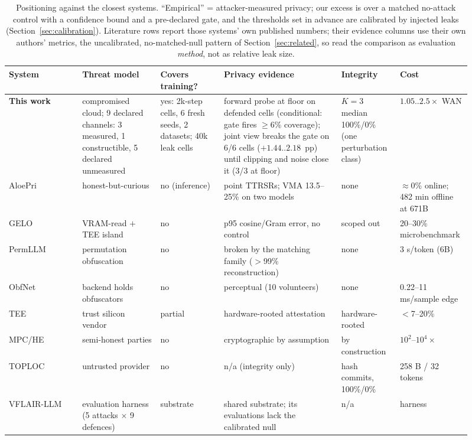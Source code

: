 \documentclass[11pt]{article}
\newcommand{\pp}{pp}
\begin{document}
\begin{table}[H]
\centering\scriptsize


\setlength{\tabcolsep}{3pt}
\begin{tabular}{@{}p{0.15\linewidth}p{0.16\linewidth}p{0.13\linewidth}p{0.24\linewidth}p{0.12\linewidth}p{0.11\linewidth}@{}}
\toprule
System & Threat model & Covers training? & Privacy evidence & Integrity & Cost \\
\midrule
\textbf{This work} & compromised cloud; 9 declared channels: 3 measured, 1 constructible, 5 declared unmeasured & yes: 2k-step cells, 6 fresh seeds, 2 datasets; 40k leak cells & forward probe at floor on defended cells (conditional: gate fires $\ge$6\% coverage); joint view breaks the gate on 6/6 cells ($+1.44..2.18$~\pp) until clipping and noise close it (3/3 at floor) & $K{=}3$ median 100\%/0\% (one perturbation class) & $1.05..2.5\times$ WAN \\
AloePri~\cite{aloepri} & honest-but-curious & no (inference) & point TTRSRs; VMA 13.5--25\% on two models & none & $\approx$0\% online; 482 min offline at 671B \\
GELO~\cite{gelo} & VRAM-read $+$ TEE island & no & p95 cosine/Gram error, no control & scoped out & 20--30\% microbenchmark \\
PermLLM~\cite{permllm} & permutation obfuscation & no & broken by the matching family ($>$99\% reconstruction) & none & 3 s/token (6B) \\
ObfNet~\cite{obfnet} & backend holds obfuscators & no & perceptual (10 volunteers) & none & 0.22--11 ms/sample edge \\
TEE~\cite{phalatee} & trust silicon vendor & partial & hardware-rooted attestation & hardware-rooted & $<$7--20\% \\
MPC/HE~\cite{sigma,bumblebee,nexus,puma} & semi-honest parties & no & cryptographic by assumption & by construction & $10^{2}$--$10^{4}\times$ \\
TOPLOC~\cite{toploc} & untrusted provider & no & n/a (integrity only) & hash commits, 100\%/0\% & 258 B / 32 tokens \\
VFLAIR-LLM~\cite{vflairllm} & evaluation harness (5 attacks $\times$ 9 defences) & substrate & shared substrate; its evaluations lack the calibrated null & n/a & harness \\
\bottomrule
\end{tabular}
\caption{Positioning against the closest systems. ``Empirical'' = attacker-measured
privacy; our excess is over a matched no-attack control with a confidence bound
and a pre-declared gate, and the thresholds set in advance are calibrated by injected
leaks (Section~\ref{sec:calibration}). Literature rows report those systems' own published numbers;
their evidence columns use their own authors' metrics, the uncalibrated,
no-matched-null pattern of Section~\ref{sec:related}, so read the comparison as evaluation
\emph{method}, not as relative leak size.}
\label{tab:positioning}
\end{table}
\end{document}
